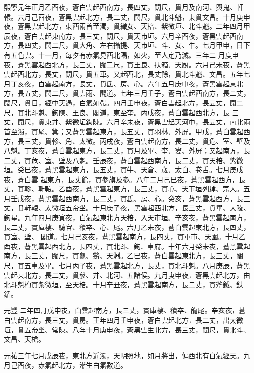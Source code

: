 \begin{pinyinscope}
 熙寧元年正月乙酉夜，蒼白雲起西南方，長四丈，闊尺，貫月及南河、輿鬼、軒轅。六月己酉夜，蒼黑雲起北方，長二丈，闊尺，貫北斗魁，東貫文昌。十月庚申夜，蒼黑雲起北方，東西兩首至濁，貫織女、天棓、紫微垣、北斗魁。二年四月甲辰夜，蒼白雲起東南方，長三丈，闊尺，貫天市垣。六月辛酉夜，蒼黑雲起西南方，長四丈，闊二尺，貫大角、左右攝提、天市垣、斗、女、牛。七月甲申，日下有五色雲。十一月，每夕有赤氣見西北隅，如火，至人定乃滅。三年二
 月庚申夜，蒼黑雲起西北方，長三丈，闊二尺，貫王良、扶箱、天廚。六月己未夜，蒼黑雲起西北方，長丈，闊尺，貫五車。又起西北，長丈餘，貫北斗魁、文昌。五年七月丁亥夜，白雲起南方，長丈，貫氐、房、心。六年五月庚申夜，蒼黑雲起東北方，長五丈，闊二尺，貫雲雨、閣道。七年三月壬子，蒼白雲起西南方，長二丈，闊尺，貫日，經中天過，白氣如帶。四月壬申夜，蒼白雲起北方，長五丈，闊二尺，貫北斗魁、鉤陳、王良、閣道，東至奎。丙戌夜，蒼白雲起西北方，長
 三丈，闊尺，貫東井、紫微垣鉤陳。六月辛未夜，蒼黑雲起天河中，長五丈，南北兩首至濁，貫尾、箕；又蒼黑雲起東方，長五丈，貫羽林、外屏。甲戌，蒼白雲起西方，長三丈，貫軫、角、太微。丙戌夜，蒼白雲起南方，長二丈，貫危、室、壁及八魁。丁亥夜，蒼白雲起東方，長二丈，貫月及畢、奎、婁、外屏；又起南方，長二丈，貫危、室、壁及八魁。壬辰夜，蒼白雲起西南方，長二丈，貫天棓、紫微垣。癸巳夜，蒼黑雲起東方，長五丈，貫牛、天倉、歲、太白、卷舌。七月庚戌夜，蒼白雲
 起東方，長丈餘，貫參旗及參。八年二月己巳夜，蒼黑雲起西方，長丈，貫軫、軒轅。乙酉夜，蒼黑雲起東方，長三丈，貫心、天市垣列肆、宗人。五月壬戌夜，蒼黑雲起西南方，長二丈，貫氐、房、心。癸亥，蒼黑雲起西方，長三丈，貫軒轅、太微垣五帝坐。十月庚子夜，黑雲起西北方，長三丈，貫畢、大陵、鉤星。九年四月庚寅夜，白氣起東北方天棓，入天市垣。辛亥夜，蒼黑雲起南方，長二丈，貫庫樓、騎官、積卒、心、尾。六月乙未夜，蒼白雲起東北方，長四丈，貫室、壁、
 閣道。七月己亥夜，蒼黑雲起南方，長四丈，貫軍市、天園。十月乙酉夜，蒼黑雲起西北方，長四丈，貫北斗、鉤、車府。十年六月癸未夜，蒼黑雲起南方，長三丈，闊尺，貫龜、鱉、天淵。乙巳夜，蒼白雲起東北方，長三丈，闊尺，貫五車及畢。七月丙子夜，蒼黑雲起北方，長丈，貫北斗魁。八月庚辰，蒼黑雲起東北方，長二丈，貫參、井、北河、五諸侯。九月庚申夜，蒼黑雲起北方，由北斗魁杓貫紫微垣，至天棓。十月辛丑夜，蒼黑雲起南方，長二丈，貫斧鉞、鈇鍎。



 元豐
 二年四月戊申夜，白雲起南方，長三丈，貫庫樓、積卒、龍尾。辛亥夜，蒼白雲起南方，長三丈，貫房。王年四月壬申夜，蒼白雲起北方，長二丈，出太微垣，貫五帝坐、常陳。八年十月庚申夜，蒼黑雲生北方，長三丈，闊尺，貫北斗、文昌、天槍。



 元祐三年七月戊辰夜，東北方近濁，天明照地，如月將出，偏西北有白氣經天。九月己酉夜，赤氣起北方，漸生白氣數道。




\end{pinyinscope}
